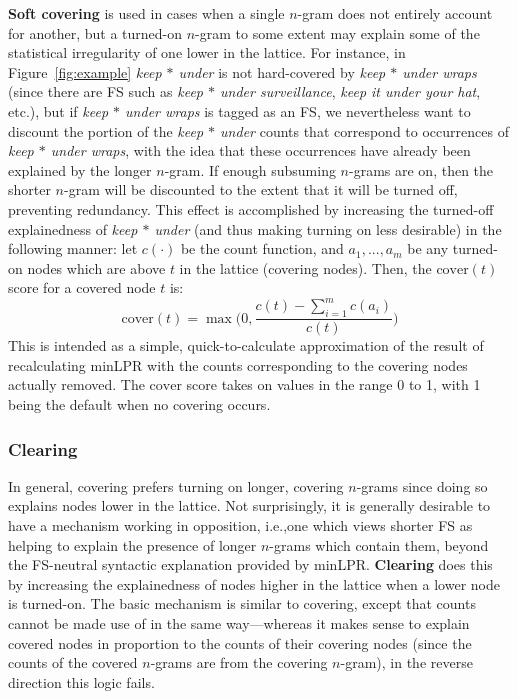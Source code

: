 \documentclass[11pt,letterpaper]{article}
\makeatletter
\def \ie {i.e.,\@ }
\def \etc {etc.\@ }
\newcommand{\dotts}{...\xspace}
\newcommand{\gap}{$*$\xspace}
\newcommand{\ex}[1]{\textit{#1}\xspace}
\newcommand{\termdef}[1]{\textbf{#1}\xspace}
\newcommand{\cover}{\ensuremath{\text{cover}}\xspace}
\newcommand{\figref}[2][]{Figure#1~\ref{#2}\xspace}
\makeatother
\begin{document}
\termdef{Soft covering} is used in cases when a single $n$-gram does not entirely account for another, but a turned-on $n$-gram to some extent may explain some of the statistical irregularity of one lower in the lattice. For instance, in \figref{fig:example} \ex{keep \gap under} is not hard-covered by \ex{keep \gap under wraps} (since there are FS such as \ex{keep \gap under surveillance}, \ex{keep it under your hat}, \etc), but if \ex{keep \gap under wraps} is tagged as an FS, we nevertheless want to discount the portion of the \ex{keep \gap under} counts that correspond to occurrences of \ex{keep \gap under wraps}, with the idea that these occurrences have already been explained by the longer $n$-gram. If enough subsuming $n$-grams are on, then the shorter $n$-gram will be discounted to the extent that it will be turned off, preventing redundancy. This effect is accomplished by increasing the turned-off explainedness of \ex{keep \gap under} (and thus making turning on less desirable) in the following manner: let $c(\cdot)$ be the count function, and $a_1,\dotts, a_m$ be any turned-on nodes which are above $t$ in the lattice (covering nodes). Then, the $\cover(t)$ score for a covered node $t$ is:
\begin{displaymath}
\cover(t) = \max\Big(0,\frac{c(t) - \sum_{i=1}^{m}{c(a_i)}}{c(t)}\Big)
\end{displaymath}
This is intended as a simple, quick-to-calculate approximation of the result of recalculating minLPR with the counts corresponding to the covering nodes actually removed. The \cover score takes on values in the range 0 to 1, with 1 being the default when no covering occurs.

\subsubsection{Clearing}

In general, covering prefers turning on longer, covering $n$-grams since doing so explains nodes lower in the lattice. Not surprisingly, it is generally desirable to have a mechanism working in opposition, \ie one which views shorter FS as helping to explain the presence of longer $n$-grams which contain them, beyond the FS-neutral syntactic explanation provided by minLPR. \termdef{Clearing} does this by increasing the explainedness of nodes higher in the lattice when a lower node is turned-on. The basic mechanism is similar to covering, except that counts cannot be made use of in the same way---whereas it makes sense to explain covered nodes in proportion to the counts of their covering nodes (since the counts of the covered $n$-grams are from the covering $n$-gram), in the reverse direction this logic fails. 
\end{document}
